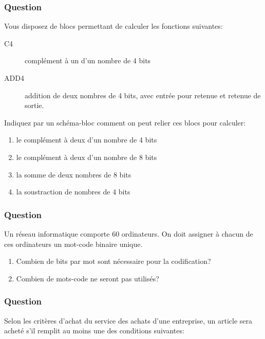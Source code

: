 \documentclass[11pt]{article}
\begin{document}
\subsubsection*{Question}
\label{sec:org45124ff}
Vous disposez de blocs permettant de calculer les fonctions
   suivantes:

\begin{description}
\item[{C4}] complément à un d'un nombre de 4 bits

\item[{ADD4}] addition de deux nombres de 4 bits, avec entrée pour retenue et
retenue de sortie.
\end{description}

Indiquez par un schéma-bloc comment on peut relier ces blocs pour
calculer:

\begin{enumerate}
\item le complément à deux d'un nombre de 4 bits

\item le complément à deux d'un nombre de 8 bits

\item la somme de deux nombres de 8 bits

\item la soustraction de nombres de 4 bits
\end{enumerate}

\subsubsection*{Question}
\label{sec:org2d3d474}
Un réseau informatique comporte 60 ordinateurs. On doit assigner à
   chacun de ces ordinateurs un mot-code binaire unique.

\begin{enumerate}
\item Combien de bits par mot sont nécessaire pour la codification?

\item Combien de mots-code ne seront pas utilisés?
\end{enumerate}

\subsubsection*{Question}
\label{sec:org8a0f361}
Selon les critères d'achat du service des achats d'une entreprise, un
  article sera acheté s'il remplit au moins une des conditions
  suivantes:
\end{document}
